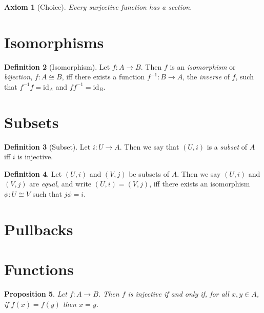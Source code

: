 \documentclass{book}
\newtheorem{ax}{Axiom}[chapter]
\newtheorem{prop}[ax]{Proposition}
\theoremstyle{definition}
\newtheorem{df}[ax]{Definition}
\newcommand{\id}[1]{\ensuremath{\mathrm{id}_{#1}}}
\begin{document}
\begin{ax}[Choice]
Every surjective function has a section.
\end{ax}

\section{Isomorphisms}

\begin{df}[Isomorphism]
Let $f : A \rightarrow B$. Then $f$ is an \emph{isomorphism} or \emph{bijection}, $f : A \cong B$, iff there exists a function $f^{-1} : B \rightarrow A$, the \emph{inverse} of $f$, such that $f^{-1} f = \id{A}$ and $f f^{-1} = \id{B}$.
\end{df}


\section{Subsets}

\begin{df}[Subset]
Let $i : U \rightarrow A$. Then we say that $(U,i)$ is a \emph{subset} of $A$ iff $i$ is injective.
\end{df}

\begin{df}
Let $(U,i)$ and $(V,j)$ be subsets of $A$. Then we say $(U,i)$ and $(V,j)$ are \emph{equal}, and write $(U,i) = (V,j)$, iff there exists an isomorphism $\phi : U \cong V$ such that $j \phi = i$.
\end{df}



\section{Pullbacks}


\section{Functions}

\begin{prop}
Let $f : A \rightarrow B$. Then $f$ is injective if and only if, for all $x, y \in A$, if $f(x) = f(y)$ then $x = y$.
\end{prop}
\end{document}
